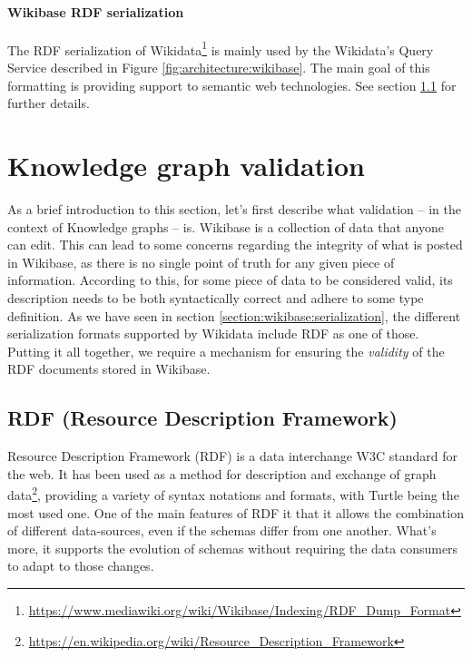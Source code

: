 \begin{dumps}
    \inputminted{json}{code/listings/6-1_serialization.json}
\end{dumps}

\paragraph[Wikibase RDF serialization]{Wikibase RDF serialization\footnotemark}

The RDF serialization of Wikidata\footnote{\url{https://www.mediawiki.org/wiki/Wikibase/Indexing/RDF_Dump_Format}} is mainly used by the Wikidata's Query Service described in Figure \ref{fig:architecture:wikibase}. The main goal of this formatting is providing support to semantic web technologies. See section \ref{section:RDF} for further details.


\section{Knowledge graph validation}

As a brief introduction to this section, let's first describe what validation -- in the context of Knowledge graphs -- is. Wikibase is a collection of data that anyone can edit. This can lead to some concerns regarding the integrity of what is posted in Wikibase, as there is no single point of truth for any given piece of information. According to this, for some piece of data to be considered valid, its description needs to be both syntactically correct and adhere to some type definition. As we have seen in section \ref{section:wikibase:serialization}, the different serialization formats supported by Wikidata include RDF as one of those. Putting it all together, we require a mechanism for ensuring the \textit{validity} of the RDF documents stored in Wikibase.

\subsection{RDF (Resource Description Framework)}
\label{section:RDF}

Resource Description Framework (RDF) is a data interchange W3C standard for the web. It has been used as a method for description and exchange of graph data\footnote{\url{https://en.wikipedia.org/wiki/Resource_Description_Framework}}, providing a variety of syntax notations and formats, with Turtle being the most used one. One of the main features of RDF it that it allows the combination of different data-sources, even if the schemas differ from one another. What's more, it supports the evolution of schemas without requiring the data consumers to adapt to those changes.

